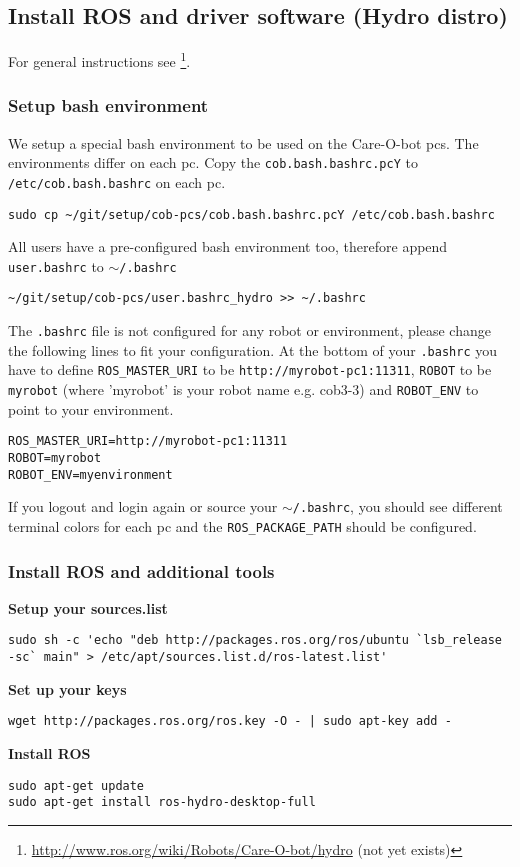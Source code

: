 \subsection{Install ROS and driver software (Hydro distro)}
For general instructions see \footnote{\url{http://www.ros.org/wiki/Robots/Care-O-bot/hydro} (not yet exists)}.

\subsubsection{Setup bash environment}
We setup a special bash environment to be used on the Care-O-bot pcs. The environments differ on each pc. Copy the \texttt{cob.bash.bashrc.pcY} to \texttt{/etc/cob.bash.bashrc} on each pc.

\begin{lstlisting}
sudo cp ~/git/setup/cob-pcs/cob.bash.bashrc.pcY /etc/cob.bash.bashrc
\end{lstlisting}

All users have a pre-configured bash environment too, therefore append \texttt{user.bashrc} to \texttt{$\sim$/.bashrc}
\begin{lstlisting}
~/git/setup/cob-pcs/user.bashrc_hydro >> ~/.bashrc
\end{lstlisting}
The \texttt{.bashrc} file is not configured for any robot or environment, please change the following lines to fit your configuration. At the bottom of your \texttt{.bashrc} you have to define \texttt{ROS\_MASTER\_URI} to be \texttt{http://myrobot-pc1:11311}, \texttt{ROBOT} to be \texttt{myrobot} (where 'myrobot' is your robot name e.g. cob3-3) and \texttt{ROBOT\_ENV} to point to your environment.
\begin{lstlisting}
ROS_MASTER_URI=http://myrobot-pc1:11311
ROBOT=myrobot
ROBOT_ENV=myenvironment
\end{lstlisting}


If you logout and login again or source your \texttt{$\sim$/.bashrc}, you should see different terminal colors for each pc and the \texttt{ROS\_PACKAGE\_PATH} should be configured. 

\subsubsection{Install ROS and additional tools}


\textbf{Setup your sources.list}
\begin{lstlisting}
sudo sh -c 'echo "deb http://packages.ros.org/ros/ubuntu `lsb_release -sc` main" > /etc/apt/sources.list.d/ros-latest.list'
\end{lstlisting}
\textbf{Set up your keys}
\begin{lstlisting}
wget http://packages.ros.org/ros.key -O - | sudo apt-key add -
\end{lstlisting}
\textbf{Install ROS}
\begin{lstlisting}
sudo apt-get update
sudo apt-get install ros-hydro-desktop-full
\end{lstlisting}

